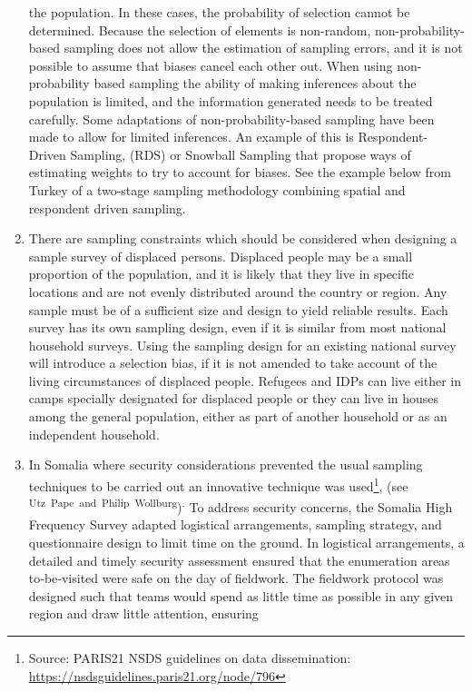 \documentclass[
]{article}
\begin{document}
\begin{enumerate}
  the population. In these cases, the probability of selection cannot
  be determined. Because the selection of elements is non-random,
  non-probability-based sampling does not allow the estimation of
  sampling errors, and it is not possible to assume that biases cancel
  each other out. When using non-probability based sampling the
  ability of making inferences about the population is limited, and
  the information generated needs to be treated carefully. Some
  adaptations of non-probability-based sampling have been made to
  allow for limited inferences. An example of this is
  Respondent-Driven Sampling, (RDS) or Snowball Sampling that propose
  ways of estimating weights to try to account for biases. See the
  example below from Turkey of a two-stage sampling methodology
  combining spatial and respondent driven sampling.
\item
  There are sampling constraints which should be considered when
  designing a sample survey of displaced persons. Displaced people may
  be a small proportion of the population, and it is likely that they
  live in specific locations and are not evenly distributed around the
  country or region. Any sample must be of a sufficient size and
  design to yield reliable results. Each survey has its own sampling
  design, even if it is similar from most national household surveys.
  Using the sampling design for an existing national survey will
  introduce a selection bias, if it is not amended to take account of
  the living circumstances of displaced people. Refugees and IDPs can
  live either in camps specially designated for displaced people or
  they can live in houses among the general population, either as part
  of another household or as an independent household.
\item
  In Somalia where security considerations prevented the usual
  sampling techniques to be carried out an innovative technique was
  used\footnote{Source: PARIS21 NSDS guidelines on data dissemination:
    \url{https://nsdsguidelines.paris21.org/node/796}}, (see \textsuperscript{Utz~Pape~and~Philip~Wollburg})\textsuperscript{.} To address
  security concerns, the Somalia High Frequency Survey adapted
  logistical arrangements, sampling strategy, and questionnaire design
  to limit time on the ground. In logistical arrangements, a detailed
  and timely security assessment ensured that the enumeration areas
  to‐be‐visited were safe on the day of fieldwork. The fieldwork
  protocol was designed such that teams would spend as little time as
  possible in any given region and draw little attention, ensuring

\end{enumerate}
\end{document}
